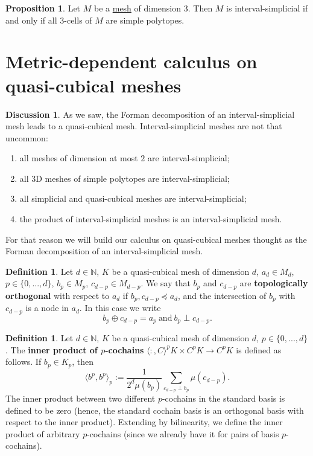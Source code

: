 \documentclass[fleqn]{article}
\theoremstyle{definition}
\newtheorem{proposition}[theorem]{Proposition}
\newtheorem{definition}[theorem]{Definition}
\newtheorem{discussion}[theorem]{Discussion}
\newcommand{\N}{\mathbb{N}}
\newcommand{\inner}[2]{\langle#1,#2\rangle}
\begin{document}
\begin{proposition}
  Let $M$ be a \hyperref[idec:mesh:definition]{mesh} of dimension $3$.
  Then $M$ is interval-simplicial if and only if all $3$-cells of $M$
  are simple polytopes.
\end{proposition}

\section{Metric-dependent calculus on quasi-cubical meshes}

\begin{discussion}
  As we saw, the Forman decomposition of an interval-simplicial mesh leads to a
  quasi-cubical mesh.
  Interval-simplicial meshes are not that uncommon:
  \begin{enumerate}
    \item
      all meshes of dimension at most $2$ are interval-simplicial;
    \item
      all $3$D meshes of simple polytopes are interval-simplicial;
    \item
      all simplicial and quasi-cubical meshes are interval-simplicial;
    \item
      the product of interval-simplicial meshes is an interval-simplicial mesh.
  \end{enumerate}
  For that reason we will build our calculus on quasi-cubical meshes thought as
  the Forman decomposition of an interval-simplicial mesh.
\end{discussion}

\begin{definition}
  Let
    $d \in \N$,
    $K$ be a quasi-cubical mesh of dimension $d$,
    $a_d \in M_d$,
    $p \in \{0, ..., d\}$,
    $b_p \in M_p$,
    $c_{d - p} \in M_{d - p}$.
  We say that $b_p$ and $c_{d - p}$ are \textbf{topologically orthogonal}
  with respect to $a_d$ if $b_p, c_{d - p} \preceq a_d$, and the intersection of
  $b_p$ with $c_{d - p}$ is a node in $a_d$.
  In this case we write
  \begin{equation}
    b_p \oplus c_{d - p} = a_p\
    \text{and}\
    b_p \perp c_{d - p}.
  \end{equation}
\end{definition}

\begin{definition}
  Let
    $d \in \N$,
    $K$ be a quasi-cubical mesh of dimension $d$,
    $p \in \{0, ..., d\}$.
  The \textbf{inner product of $p$-cochains}
  $\inner \colon C^p K \times C^p K \to C^p K$
  is defined as follows.
  If $b_p \in K_p$, then
  \begin{equation}
    \inner{b^p}{b^p}_p :=
    \frac{1}{2^d \mu(b_p)} \sum_{c_{d - p} \perp b_p} \mu(c_{d - p}).
  \end{equation}
  The inner product between two different $p$-cochains in the standard basis is
  defined to be zero
  (hence, the standard cochain basis is an orthogonal basis with respect to the
  inner product).
  Extending by bilinearity, we define the inner product of arbitrary
  $p$-cochains (since we already have it for pairs of basis $p$-cochains).
\end{definition}
\end{document}
